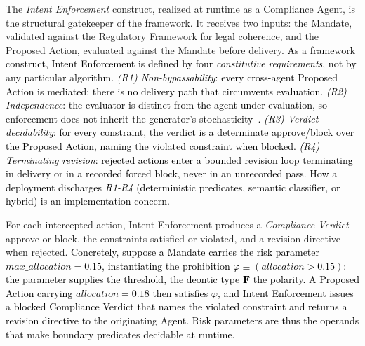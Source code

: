 \documentclass[runningheads]{llncs}
\begin{document}
The \textit{Intent Enforcement} construct, realized at
runtime as a Compliance Agent, is the structural gatekeeper of the framework. It receives two inputs: the Mandate, validated against the Regulatory Framework for legal coherence, and the Proposed Action, evaluated against the Mandate before delivery.
\textcolor{black}{As a framework construct, Intent Enforcement is defined by four \emph{constitutive requirements}, not by any particular algorithm. \textit{(R1) Non-bypassability}: every cross-agent Proposed Action is mediated; there is no delivery path that circumvents evaluation. \textit{(R2) Independence}: the evaluator is distinct from the agent under evaluation, so enforcement does not inherit the generator's stochasticity~\cite{huang2023selfcorrect}. \textit{(R3) Verdict decidability}: for every constraint, the verdict is a determinate approve/block over the Proposed Action, naming the violated constraint when blocked. \textit{(R4) Terminating revision}: rejected actions enter a bounded revision loop terminating in delivery or in a recorded forced block, never in an unrecorded pass. 
How a deployment discharges \textit{R1-R4} (deterministic predicates, semantic classifier, or hybrid) is an implementation concern.}

\vspace{-1pt}
For each intercepted action, Intent Enforcement produces a
\textit{Compliance Verdict} -- approve or block, the constraints
satisfied or violated, and a revision directive when rejected. 
\textcolor{black}{Concretely, suppose a Mandate carries the risk parameter $\mathit{max\_allocation}=0.15$, instantiating the prohibition $\varphi \equiv (\mathit{allocation} > 0.15)$: the parameter supplies the threshold, the deontic type $\mathbf{F}$ the polarity. A Proposed Action carrying $\mathit{allocation}=0.18$ then satisfies $\varphi$, and Intent Enforcement issues a blocked Compliance Verdict that names the violated constraint and returns a revision directive to the 
originating Agent. Risk parameters are thus the operands that make boundary predicates decidable at runtime.}

\end{document}
